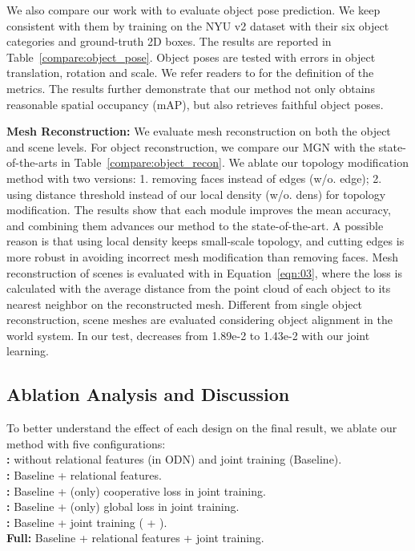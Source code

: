 \documentclass[10pt,twocolumn,letterpaper]{article}
\begin{document}
We also compare our work with \cite{tulsiani2018factoring} to evaluate object pose prediction. We keep consistent with them by training on the NYU v2 dataset \cite{silberman2012indoor} with their six object categories and ground-truth 2D boxes. The results are reported in Table~\ref{compare:object_pose}. Object poses are tested with errors in object translation, rotation and scale. We refer readers to \cite{tulsiani2018factoring} for the definition of the metrics. The results further demonstrate that our method not only obtains reasonable spatial occupancy (mAP), but also retrieves faithful object poses.

\noindent\textbf{Mesh Reconstruction:} We evaluate mesh reconstruction on both the object and scene levels. For object reconstruction, we compare our MGN with the state-of-the-arts \cite{groueix2018,Junyi} in Table~\ref{compare:object_recon}. We ablate our topology modification method with two versions: 1. removing faces instead of edges (w/o. edge); 2. using distance threshold \cite{Junyi} instead of our local density (w/o. dens) for topology modification. The results show that each module improves the mean accuracy, and combining them advances our method to the state-of-the-art. A possible reason is that using local density keeps small-scale topology, and cutting edges is more robust in avoiding incorrect mesh modification than removing faces. Mesh reconstruction of scenes is evaluated with  in Equation~\ref{eqn:03}, where the loss is calculated with the average distance from the point cloud of each object to its nearest neighbor on the reconstructed mesh. Different from single object reconstruction, scene meshes are evaluated considering object alignment in the world system. In our test,  decreases from 1.89e-2 to 1.43e-2 with our joint learning.

\subsection{Ablation Analysis and Discussion}
To better understand the effect of each design on the final result, we ablate our method with five configurations:\\
\noindent \textbf{:} without relational features (in ODN) and joint training (Baseline).\\
\noindent \textbf{:} Baseline + relational features.\\
\noindent \textbf{:} Baseline + (only) cooperative loss  in joint training.\\
\noindent \textbf{:} Baseline + (only) global loss  in joint training.\\
\noindent \textbf{:} Baseline + joint training ( + ).\\
\noindent \textbf{Full:} Baseline + relational features + joint training.
\end{document}
